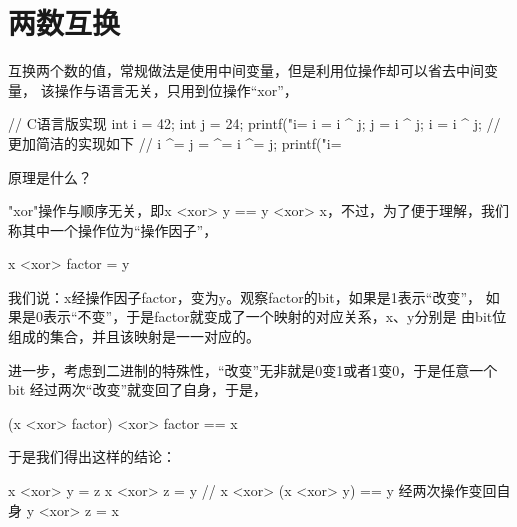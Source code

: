 ﻿\section[Swap two numbers]{两数互换}
互换两个数的值，常规做法是使用中间变量，但是利用位操作却可以省去中间变量，
该操作与语言无关，只用到位操作“xor”，

\begin{cppcode}
// C语言版实现
int i = 42;
int j = 24;
printf("i=%
i = i ^ j;
j = i ^ j;
i = i ^ j;
// 更加简洁的实现如下
// i ^= j = ^= i ^= j;
printf("i=%
\end{cppcode}

原理是什么？

"xor"操作与顺序无关，即x <xor> y == y <xor> x，不过，为了便于理解，我们
称其中一个操作位为“操作因子”，

\centerline{x <xor> factor = y}

我们说：x经操作因子factor，变为y。观察factor的bit，如果是1表示“改变”，
如果是0表示“不变”，于是factor就变成了一个映射的对应关系，x、y分别是
由bit位组成的集合，并且该映射是一一对应的。

进一步，考虑到二进制的特殊性，“改变”无非就是0变1或者1变0，于是任意一个bit
经过两次“改变”就变回了自身，于是，

\centerline{(x <xor> factor) <xor> factor == x}

于是我们得出这样的结论：

\begin{cppcode}
x <xor> y = z
x <xor> z = y // x <xor> (x <xor> y) == y 经两次操作变回自身
y <xor> z = x
\end{cppcode}